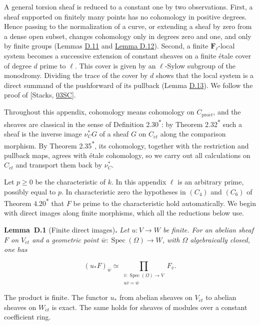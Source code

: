 \documentclass[11pt]{article}
\newenvironment{bpstatement}[2]{\par\addvspace{0.6\baselineskip}\noindent\textbf{#1}#2\textbf{.}\enspace\ignorespaces}
  {\par\addvspace{0.4\baselineskip}}
\newenvironment{bpstatementit}[2]{\begin{bpstatement}{#1}{#2}\itshape\ignorespaces}{\end{bpstatement}}
\newcommand{\bpout}[1]{#1\textsuperscript{\hyperlink{bp-outside}{\ensuremath{\ast}}}}
\begin{document}
A general torsion sheaf is reduced to a constant one by two observations. First, a sheaf supported on finitely many points has no cohomology in positive degrees. Hence passing to the normalization of a curve, or extending a sheaf by zero from a dense open subset, changes cohomology only in degrees zero and one, and only by finite groups (Lemmas \hyperref[bp36]{D.11} and \hyperref[bp41]{Lemma D.12}). Second, a finite \(\mathbf F_\ell\)-local system becomes a successive extension of constant sheaves on a finite étale cover of degree \(d\) prime to \(\ell\). This cover is given by an \(\ell\)-Sylow subgroup of the monodromy. Dividing the trace of the cover by \(d\) shows that the local system is a direct summand of the pushforward of its pullback (Lemma \hyperref[bp46]{D.13}). We follow the proof of [Stacks, \href{https://stacks.math.columbia.edu/tag/03SC}{03SC}].

Throughout this appendix, cohomology means cohomology on \(C_{\mathrm{pro}\acute{e}t}\), and the sheaves are classical in the sense of Definition \bpout{2.30}: by Theorem \bpout{2.32} such a sheaf is the inverse image \(\nu_C^*G\) of a sheaf \(G\) on \(C_{\acute{e}t}\) along the comparison morphism. By Theorem \bpout{2.35}, its cohomology, together with the restriction and pullback maps, agrees with étale cohomology, so we carry out all calculations on \(C_{\acute{e}t}\) and transport them back by \(\nu_C^*\).

Let \(p\ge0\) be the characteristic of \(k\). In this appendix \(\ell\) is an arbitrary prime, possibly equal to \(p\). In characteristic zero the hypotheses in \((C_4)\) and \((C_6)\) of Theorem \bpout{4.20} that \(F\) be prime to the characteristic hold automatically. We begin with direct images along finite morphisms, which all the reductions below use.

\label{bp3}%
\begin{bpstatementit}{Lemma~D.1}{ (Finite direct images)}
Let \(u:V\to W\) be finite. For an abelian sheaf \(F\) on \(V_{\acute{e}t}\) and a geometric point \(\bar w:\operatorname{Spec}(\Omega)\to W\), with \(\Omega\) algebraically closed, one has

\[
(u_*F)_{\bar w}
\simeq \prod_{\substack{\bar v:\operatorname{Spec}(\Omega)\to V\\
u\bar v=\bar w}}F_{\bar v}.
\]

The product is finite. The functor \(u_*\) from abelian sheaves on \(V_{\acute{e}t}\) to abelian sheaves on \(W_{\acute{e}t}\) is exact. The same holds for sheaves of modules over a constant coefficient ring.
\end{bpstatementit}
\end{document}
